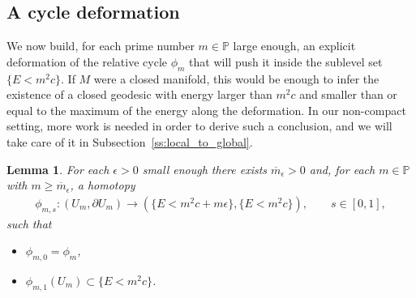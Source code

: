 \documentclass[reqno]{amsart}
\numberwithin{equation}{section}
\theoremstyle{personal}%
\newtheorem{lem}[thm]{Lemma}
\theoremstyle{definition}
\newcommand{\PP}{\mathds{P}}
\begin{document}
\subsection{A cycle deformation}
We now build, for each prime number $m\in\PP$ large enough, an explicit deformation of the relative cycle $\phi_m$ that will push it inside the sublevel set $\{E<m^2c\}$. If $M$ were a closed manifold, this would be enough to infer the existence of a closed geodesic with energy larger than $m^2c$ and smaller than or equal to the maximum of the energy along the deformation. In our non-compact setting, more work is needed in order to derive such a conclusion, and we will take care of it in Subsection~\ref{ss:local_to_global}. 




\begin{lem}
\label{l:homotopy_h_ms}
For each $\epsilon>0$ small enough there exists $\overline m_\epsilon>0$ and, for each $m\in\PP$ with $m\geq\overline m_\epsilon$, a homotopy
\begin{align}
\label{e:homotopy_h_ms}
 \phi_{m,s}: (U_m,\partial U_m) 
 \to 
 (\{E<m^2c+m\epsilon\},\{E<m^2c\}),
 \qquad s\in[0,1],
\end{align}
such that 
\begin{itemize}
\item[(i)] $\phi_{m,0}=\phi_m$,
\item[(ii)] $\phi_{m,1}(U_m)\subset \{E<m^2c\}$.
\end{itemize}
\end{lem}
\end{document}
